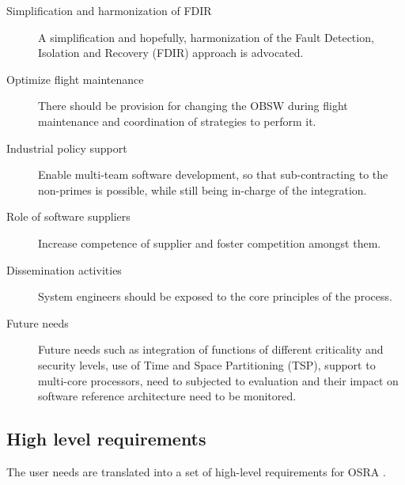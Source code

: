 \begin{description}
\item [Simplification and harmonization of FDIR] A simplification and hopefully, harmonization of the Fault Detection, Isolation and Recovery (FDIR) approach is advocated.

\item [Optimize flight maintenance] There should be provision for changing the OBSW during flight maintenance and coordination of strategies to perform it. 

\item [Industrial policy support] Enable multi-team software development, so that sub-contracting to the non-primes is possible, while still being in-charge of the integration.

\item [Role of software suppliers] Increase competence of supplier and foster competition amongst them. 

\item [Dissemination activities] System engineers should be exposed to the core principles of the process.

\item [Future needs] Future needs such as integration of functions of different criticality and security levels, use of Time and Space Partitioning (TSP), support to multi-core processors, need to subjected to evaluation and their impact on software reference architecture need to be monitored.
\end{description} 

\subsection{High level requirements}
\label{subsection: High level requirements}
The user needs are translated into a set of high-level requirements for OSRA \cite{SAVOIR,PhdThesis}.

